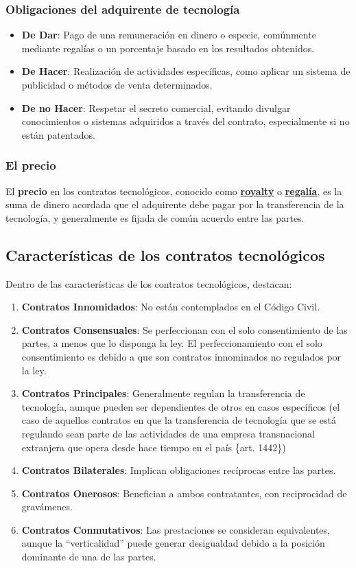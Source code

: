 \documentclass{templateNote}
\begin{document}
\subsubsection*{Obligaciones del adquirente de tecnología}
\begin{itemize}
    \item \textbf{De Dar}: Pago de una remuneración en dinero o especie, comúnmente mediante regalías o un porcentaje basado en los resultados obtenidos.
    \item \textbf{De Hacer}: Realización de actividades específicas, como aplicar un sistema de publicidad o métodos de venta determinados.
    \item \textbf{De no Hacer}: Respetar el secreto comercial, evitando divulgar conocimientos o sistemas adquiridos a través del contrato, especialmente si no están patentados.
\end{itemize}

\subsubsection*{El precio}
El \textbf{precio} en los contratos tecnológicos, conocido como \underline{\textbf{royalty}} o \underline{\textbf{regalía}}, es la suma de dinero acordada que el adquirente debe pagar por la transferencia de la tecnología, y generalmente es fijada de común acuerdo entre las partes.


\subsection{Características de los contratos tecnológicos}
Dentro de las características de los contratos tecnológicos, destacan:
\begin{enumerate}
    \item \textbf{Contratos Innomidados}: No están contemplados en el Código Civil.
    \item \textbf{Contratos Consensuales}: Se perfeccionan con el solo consentimiento de las partes, a menos que lo disponga la ley. El perfeccionamiento con el solo consentimiento es debido a que son contratos innominados no regulados por la ley.
    \item \textbf{Contratos Principales}: Generalmente regulan la transferencia de tecnología, aunque pueden ser dependientes de otros en casos específicos (el caso de aquellos contratos en que la transferencia de tecnología que se está regulando sean parte de las actividades de una empresa transnacional extranjera que opera desde hace tiempo en el país \{art. 1442\})
    \item \textbf{Contratos Bilaterales}: Implican obligaciones recíprocas entre las partes.
    \item \textbf{Contratos Onerosos}: Benefician a ambos contratantes, con reciprocidad de gravámenes.
    \item \textbf{Contratos Conmutativos}: Las prestaciones se consideran equivalentes, aunque la ``verticalidad'' puede generar desigualdad debido a la posición dominante de una de las partes.
\end{enumerate}
\end{document}
